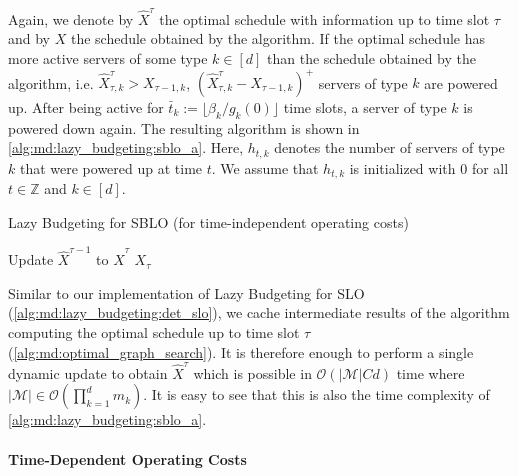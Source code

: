 Again, we denote by $\hat{X}^{\tau}$ the optimal schedule with information up to time slot $\tau$ and by $X$ the schedule obtained by the algorithm. If the optimal schedule has more active servers of some type $k \in [d]$ than the schedule obtained by the algorithm, i.e. $\hat{X}_{\tau,k}^{\tau} > X_{\tau-1,k}$, $(\hat{X}_{\tau,k}^{\tau} - X_{\tau-1,k})^+$ servers of type $k$ are powered up. After being active for $\bar{t}_k := \lfloor \beta_k / g_k(0) \rfloor$ time slots, a server of type $k$ is powered down again. The resulting algorithm is shown in \cref{alg:md:lazy_budgeting:sblo_a}. Here, $h_{t,k}$ denotes the number of servers of type $k$ that were powered up at time $t$. We assume that $h_{t,k}$ is initialized with $0$ for all $t \in \mathbb{Z}$ and $k \in [d]$.

\begin{algorithm}
    \caption{Lazy Budgeting for SBLO (for time-independent operating costs)~\cite{Albers2021_2}}\label{alg:md:lazy_budgeting:sblo_a}
    Update $\hat{X}^{\tau-1}$ to $\hat{X}^{\tau}$\;
    \Return $X_{\tau}$\;
\end{algorithm}

Similar to our implementation of Lazy Budgeting for SLO (\cref{alg:md:lazy_budgeting:det_slo}), we cache intermediate results of the algorithm computing the optimal schedule up to time slot $\tau$ (\cref{alg:md:optimal_graph_search}). It is therefore enough to perform a single dynamic update to obtain $\hat{X}^{\tau}$ which is possible in $\mathcal{O}(|\mathcal{M}| C d)$ time where $|\mathcal{M}| \in \mathcal{O}(\prod_{k=1}^d m_k)$. It is easy to see that this is also the time complexity of \cref{alg:md:lazy_budgeting:sblo_a}.

\paragraph{Time-Dependent Operating Costs}


